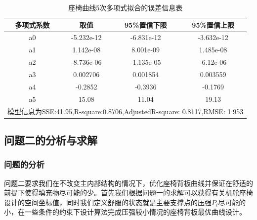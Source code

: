         \begin{table}[H]
        \centering
        \caption{座椅曲线5次多项式拟合的误差信息表}
        \label{座椅曲线5次多项式拟合的误差信息表}
        \begin{tabular}{cccc}
        \toprule
        多项式系数  & 取值&95\%置信下限 &95\%置信上限\\
        \midrule
        a0 &  -5.232e-12&   -6.831e-12 &  -3.632e-12\\
        a1 &  1.142e-08 &   8.001e-09 &   1.485e-08\\
        a2 &  -8.736e-06 &  -1.135e-05 &  -6.12e-06\\
        a3 &  0.002706 &    0.001854 &    0.003559\\
        a4 &  -0.2852&  -0.3936&  -0.1769\\
        a5 &  15.08  &  11.04 &   19.13\\
        \bottomrule
        \multicolumn{4}{l}{\footnotesize 模型信息为SSE:41.95,R-square:0.8706,AdjustedR-square: 0.8117,RMSE: 1.953}\\
        \end{tabular}
        \end{table}

    \subsection{问题二的分析与求解}
        \subsubsection{问题的分析}
            \par
            问题二要求我们在不改变主内部结构的情况下，优化座椅背板曲线并保证在舒适的前提下使得填充物尽可能的少。首先我们根据问题一的求解可以获得有关机舱座椅设计的空间坐标值，同时我们定义舒服的状态就是主要支撑点的压强$P_i$尽可能的小，在一些条件的约束下设计算法完成压强较小情况的座椅背板最优曲线设计。
